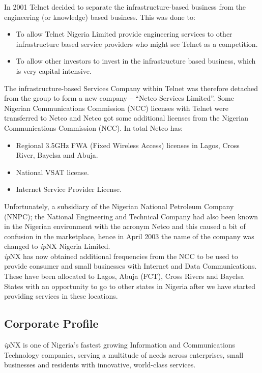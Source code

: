 In 2001 Telnet decided to separate the infrastructure-based business from the engineering
(or knowledge) based business. This was done to:
\begin{itemize}
	\item To allow Telnet Nigeria Limited provide engineering services to other infrastructure
	based service providers who might see Telnet as a competition.
	\item To allow other investors to invest in the infrastructure based business, which is very
	capital intensive.
\end{itemize}

The infrastructure-based Services Company within Telnet was therefore detached from the group to form a new company – “Netco Services Limited”. Some Nigerian Communications Commission (NCC) licenses with Telnet were transferred to Netco and
Netco got some additional licenses from the Nigerian Communications Commission (NCC). In total Netco has:

\begin{itemize}	
	\item Regional 3.5GHz FWA (Fixed Wireless Access) licenses in Lagos, Cross River, Bayelsa
	and Abuja.

	\item National VSAT license.
	\item Internet Service Provider License.
\end{itemize}

Unfortunately, a subsidiary of the Nigerian National Petroleum Company (NNPC); the National Engineering and Technical Company had also been known in the Nigerian environment with the acronym Netco and this caused a bit of confusion in the marketplace, hence in April 2003 the name of the company was changed to \textit{ip}NX Nigeria Limited.\\

\textit{ip}NX has now obtained additional frequencies from the NCC to be used to provide consumer and small businesses with Internet and Data Communications. These have been allocated to Lagos, Abuja (FCT), Cross Rivers and Bayelsa States with an opportunity to go to other states in Nigeria after we have started providing services in these locations.
\subsection{Corporate Profile}
\textit{ip}NX is one of Nigeria’s fastest growing Information and Communications Technology companies, serving a multitude of needs across enterprises, small businesses and residents with innovative, world-class services.

